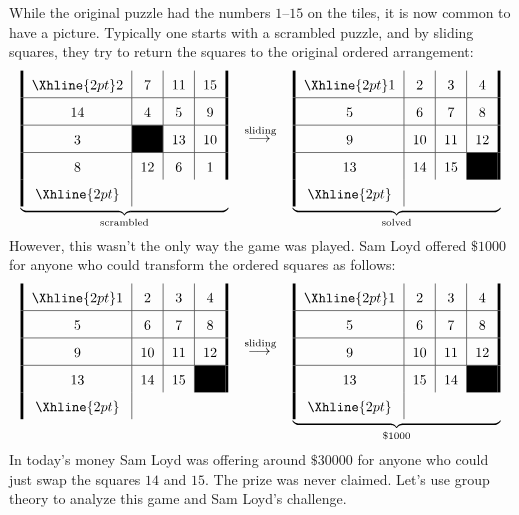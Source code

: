 \documentclass{ximera}
\begin{document}
While the original puzzle had the numbers $1$--$15$ on the tiles, it is
now common to have a picture. Typically one starts with a scrambled
puzzle, and by sliding squares, they try to return the squares to the
original ordered arrangement:
\[
\arraycolsep=6pt\def\arraystretch{1.6}
\underbrace{\begin{array}{!{\vline width 2pt}c|c|c|c!{\vline width 2pt}}
    \Xhline{2pt}
    2 & 7  & 11 & 15\\ \hline
    14 & 4  & 5  & 9 \\ \hline
    3  &  \cellcolor{black}  & 13 & 10  \\ \hline
    8  & 12 & 6 & 1 \\%
    \Xhline{2pt}
\end{array}}_{\text{scrambled}}
\quad\lto^{\text{sliding}}\quad
\underbrace{\begin{array}{!{\vline width 2pt}c|c|c|c!{\vline width 2pt}}
    \Xhline{2pt}
    1  & 2  & 3  & 4 \\ \hline
    5  & 6  & 7  & 8 \\ \hline
    9  & 10 & 11 & 12 \\ \hline
    13 & 14 & 15 & \cellcolor{black}\\%
    \Xhline{2pt}
\end{array}}_{\text{solved}}
\]
However, this wasn't the only way the game was played. Sam Loyd offered
$\$1000$ for anyone who could transform the ordered squares as
follows:
\[
\arraycolsep=6pt\def\arraystretch{1.6}
\begin{array}{!{\vline width 2pt}c|c|c|c!{\vline width 2pt}}
    \Xhline{2pt}
    1  & 2  & 3  & 4 \\ \hline
    5  & 6  & 7  & 8 \\ \hline
    9  & 10 & 11 & 12 \\ \hline
    13 & 14 & 15 & \cellcolor{black} \\
    \Xhline{2pt}
\end{array}\quad\lto^{\text{sliding}}\quad
\underbrace{\begin{array}{!{\vline width 2pt}c|c|c|c!{\vline width 2pt}}
    \Xhline{2pt}
    1  & 2  & 3  & 4 \\ \hline
    5  & 6  & 7  & 8 \\ \hline
    9  & 10 & 11 & 12 \\ \hline
    13 & 15 & 14 & \cellcolor{black} \\
    \Xhline{2pt}
\end{array}}_{\$1000}
\]
In today's money Sam Loyd was offering around $\$30000$ for anyone who
could just swap the squares $14$ and $15$. The prize was never
claimed. Let's use group theory to analyze this game and Sam Loyd's
challenge.
\end{document}
